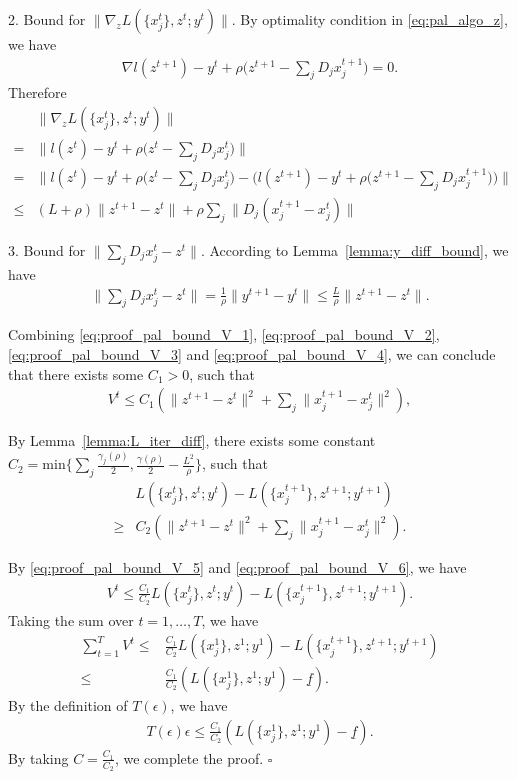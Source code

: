 2. Bound for $\|\nabla_{z} L(\{x^t_j\}, z^t; y^t)\|$. By optimality condition in \eqref{eq:pal_algo_z}, we have
\begin{align}
    \nabla l(z^{t+1}) - y^t + \rho\big(z^{t+1} - \sum_j D_j x_j^{t+1}\big) = 0.\nonumber
\end{align}
Therefore
\begin{align}
        & \|\nabla_{z} L(\{x^t_j\}, z^t; y^t)\|\nonumber\\
        = & \| l(z^{t}) - y^t + \rho\big(z^{t} - \sum_j D_j x_j^{t}\big) \|\nonumber\\
        = & \|l(z^{t}) - y^t + \rho\big(z^{t} - \sum_j D_j x_j^{t}\big) - \big(l(z^{t+1}) - y^t + \rho\big(z^{t+1} - \sum_j D_j x_j^{t+1}\big)\big)\|\nonumber\\
        \le & (L+\rho)\|z^{t+1} - z^{t}\| + \rho\sum_j\|D_j(x_j^{t+1}-x_j^{t})\|\label{eq:proof_pal_bound_V_3}
\end{align}

3. Bound for $\|\sum_j D_jx_j^t - z^t\|$. According to Lemma~\ref{lemma:y_diff_bound}, we have
\begin{align}
     \|\sum_j D_jx_j^t - z^t\| = \frac{1}{\rho}\|y^{t+1}-y^t\| \le \frac{L}{\rho}\|z^{t+1}-z^t\|. \label{eq:proof_pal_bound_V_4}
\end{align}

Combining \eqref{eq:proof_pal_bound_V_1}, \eqref{eq:proof_pal_bound_V_2}, \eqref{eq:proof_pal_bound_V_3} and \eqref{eq:proof_pal_bound_V_4}, we can conclude that there exists some $C_1>0$, such that
\begin{align}
    V^t \le C_1(\|z^{t+1}-z^t\|^2 + \sum_j\|x_j^{t+1}-x_j^t\|^2), \label{eq:proof_pal_bound_V_5}
\end{align}

By Lemma~\ref{lemma:L_iter_diff}, there exists some constant $C_2 = \text{min}\{\sum_j\frac{\gamma_j(\rho)}{2}, \frac{\gamma(\rho)}{2} - \frac{L^2}{\rho}\}$, such that
\begin{align}
    & L(\{x_j^t\}, z^t; y^t) - L(\{x_j^{t+1}\}, z^{t+1}; y^{t+1})\nonumber\\
    \ge & C_2 (\|z^{t+1}-z^t\|^2 + \sum_j\|x_j^{t+1}-x_j^t\|^2). \label{eq:proof_pal_bound_V_6}
\end{align}

By \eqref{eq:proof_pal_bound_V_5} and \eqref{eq:proof_pal_bound_V_6}, we have
\begin{align}
    V^t\le \frac{C_1}{C_2}L(\{x_j^t\}, z^t; y^t) - L(\{x_j^{t+1}\}, z^{t+1}; y^{t+1}).
\end{align}
Taking the sum over $t=1,\ldots, T$, we have
\begin{align}
    \sum_{t=1}^T V^t \le & \frac{C_1}{C_2} L(\{x_j^1\}, z^1; y^1) - L(\{x_j^{t+1}\}, z^{t+1}; y^{t+1})\nonumber\\
    \le & \frac{C_1}{C_2} (L(\{x_j^1\}, z^1; y^1) - \underline{f}).
\end{align}
By the definition of $T(\epsilon)$, we have 
\begin{align}
    T(\epsilon)\epsilon \le \frac{C_1}{C_2} (L(\{x_j^1\}, z^1; y^1)  - \underline{f}).
\end{align}
By taking $C = \frac{C_1}{C_2}$, we complete the proof. \hfill$\square$

